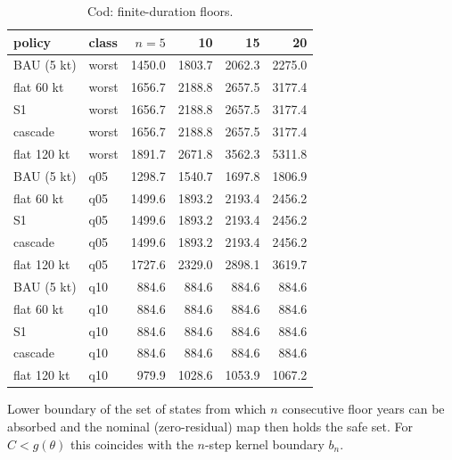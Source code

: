 \begin{table}[H]
\centering
\caption{Cod: finite-duration floors.}
\label{tab:si-cod-floors}
\small
\begin{tabular}{llrrrr}
\toprule
policy & class & $n=5$ & 10 & 15 & 20 \\
\midrule
BAU (5 kt) & worst & 1450.0 & 1803.7 & 2062.3 & 2275.0 \\
flat 60 kt & worst & 1656.7 & 2188.8 & 2657.5 & 3177.4 \\
S1 & worst & 1656.7 & 2188.8 & 2657.5 & 3177.4 \\
cascade & worst & 1656.7 & 2188.8 & 2657.5 & 3177.4 \\
flat 120 kt & worst & 1891.7 & 2671.8 & 3562.3 & 5311.8 \\
BAU (5 kt) & q05 & 1298.7 & 1540.7 & 1697.8 & 1806.9 \\
flat 60 kt & q05 & 1499.6 & 1893.2 & 2193.4 & 2456.2 \\
S1 & q05 & 1499.6 & 1893.2 & 2193.4 & 2456.2 \\
cascade & q05 & 1499.6 & 1893.2 & 2193.4 & 2456.2 \\
flat 120 kt & q05 & 1727.6 & 2329.0 & 2898.1 & 3619.7 \\
BAU (5 kt) & q10 & 884.6 & 884.6 & 884.6 & 884.6 \\
flat 60 kt & q10 & 884.6 & 884.6 & 884.6 & 884.6 \\
S1 & q10 & 884.6 & 884.6 & 884.6 & 884.6 \\
cascade & q10 & 884.6 & 884.6 & 884.6 & 884.6 \\
flat 120 kt & q10 & 979.9 & 1028.6 & 1053.9 & 1067.2 \\
\bottomrule
\end{tabular}
\par\smallskip\begin{minipage}{0.97\linewidth}\footnotesize Lower boundary of the set of states from which $n$ consecutive floor years can be absorbed and the nominal (zero-residual) map then holds the safe set. For $C<g(\theta)$ this coincides with the $n$-step kernel boundary $b_n$.\end{minipage}
\end{table}
